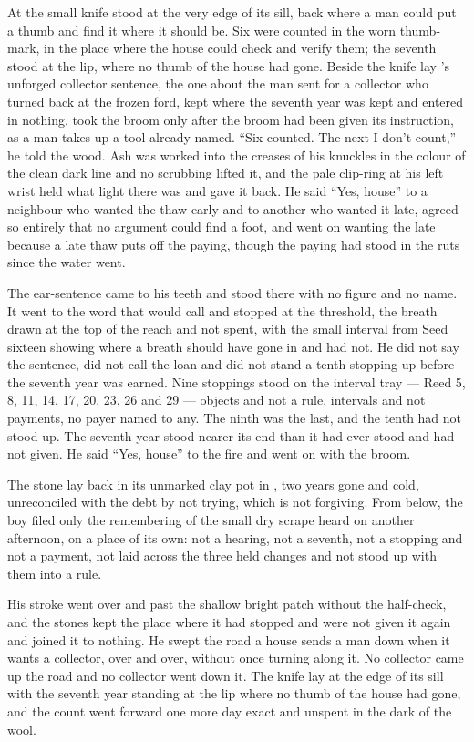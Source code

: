 At  the small knife stood at the very edge of its sill, back where a man could put a thumb and find it where it should be. Six were counted in the worn thumb-mark, in the place where the house could check and verify them; the seventh stood at the lip, where no thumb of the house had gone. Beside the knife lay 's unforged collector sentence, the one about the man sent for a collector who turned back at the frozen ford, kept where the seventh year was kept and entered in nothing.  took the broom only after the broom had been given its instruction, as a man takes up a tool already named. “Six counted. The next I don't count,” he told the wood. Ash was worked into the creases of his knuckles in the colour of the clean dark line and no scrubbing lifted it, and the pale clip-ring at his left wrist held what light there was and gave it back. He said “Yes, house” to a neighbour who wanted the thaw early and to another who wanted it late, agreed so entirely that no argument could find a foot, and went on wanting the late because a late thaw puts off the paying, though the paying had stood in the ruts since the water went.

The ear-sentence came to his teeth and stood there with no figure and no name. It went to the word that would call  and stopped at the threshold, the breath drawn at the top of the reach and not spent, with the small interval from Seed sixteen showing where a breath should have gone in and had not. He did not say the sentence, did not call the loan and did not stand a tenth stopping up before the seventh year was earned. Nine stoppings stood on the interval tray --- Reed 5, 8, 11, 14, 17, 20, 23, 26 and 29 --- objects and not a rule, intervals and not payments, no payer named to any. The ninth was the last, and the tenth had not stood up. The seventh year stood nearer its end than it had ever stood and had not given. He said “Yes, house” to the fire and went on with the broom.

The stone lay back in its unmarked clay pot in , two years gone and cold, unreconciled with the debt by not trying, which is not forgiving. From below, the boy filed only the remembering of the small dry scrape heard on another afternoon, on a place of its own: not a hearing, not a seventh, not a stopping and not a payment, not laid across the three held changes and not stood up with them into a rule.

His stroke went over  and past the shallow bright patch without the half-check, and the stones kept the place where it had stopped and were not given it again and joined it to nothing. He swept the road a house sends a man down when it wants a collector, over and over, without once turning along it. No collector came up the road and no collector went down it. The knife lay at the edge of its sill with the seventh year standing at the lip where no thumb of the house had gone, and the count went forward one more day exact and unspent in the dark of the wool.
